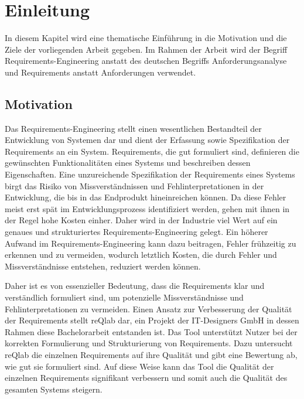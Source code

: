 \chapter{Einleitung} %

In diesem Kapitel wird eine thematische Einführung in die Motivation und die Ziele der vorliegenden Arbeit gegeben.
Im Rahmen der Arbeit wird der Begriff \glqq{}Requirements-Engineering\grqq{} anstatt des deutschen Begriffs \glqq{}Anforderungsanalyse\grqq{} und \glqq{}Requirements\grqq{} anstatt \glqq{}Anforderungen\grqq{} verwendet.

\section{Motivation}
\label{section:motivation}

Das Requirements-Engineering stellt einen wesentlichen Bestandteil der Entwicklung von Systemen dar und dient der Erfassung sowie Spezifikation der Requirements an ein System.
Requirements, die gut formuliert sind, definieren die gewünschten Funktionalitäten eines Systems und beschreiben dessen Eigenschaften.
Eine unzureichende Spezifikation der Requirements eines Systems birgt das Risiko von Missverständnissen und Fehlinterpretationen in der Entwicklung, die bis in das Endprodukt hineinreichen können.
Da diese Fehler meist erst spät im Entwicklungsprozess identifiziert werden, gehen mit ihnen in der Regel hohe Kosten einher.
Daher wird in der Industrie viel Wert auf ein genaues und strukturiertes Requirements-Engineering gelegt.
Ein höherer Aufwand im Requirements-Engineering kann dazu beitragen, Fehler frühzeitig zu erkennen und zu vermeiden, wodurch letztlich Kosten, die durch Fehler und Missverständnisse entstehen, reduziert werden können.

Daher ist es von essenzieller Bedeutung, dass die Requirements klar und verständlich formuliert sind, um potenzielle Missverständnisse und Fehlinterpretationen zu vermeiden.
Einen Ansatz zur Verbesserung der Qualität der Requirements stellt reQlab dar, ein Projekt der IT-Designers GmbH in dessen Rahmen diese Bachelorarbeit entstanden ist.
Das Tool unterstützt Nutzer bei der korrekten Formulierung und Strukturierung von Requirements.
Dazu untersucht reQlab die einzelnen Requirements auf ihre Qualität und gibt eine Bewertung ab, wie gut sie formuliert sind.
Auf diese Weise kann das Tool die Qualität der einzelnen Requirements signifikant verbessern und somit auch die Qualität des gesamten Systems steigern.

